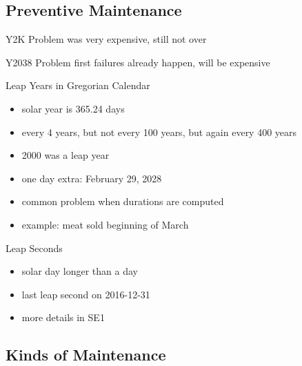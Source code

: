 \subsection{Preventive Maintenance}
\begin{frame}{\insertsubsection}
	\begin{fancycolumns}
		\begin{definition}{\insertsubsection\mysource{\lientzswanson}}
			 \hfill {}
		\end{definition}
		\begin{example}{Y2K Problem}
			was very expensive, still not over
		\end{example}
		\begin{example}{Y2038 Problem}
			first failures already happen, will be expensive
		\end{example}
	\nextcolumn
		\begin{example}{Leap Years in Gregorian Calendar}
			\begin{itemize}
				\item solar year is 365.24 days
				\item every 4 years, but not every 100 years, but again every 400 years
				\item 2000 was a leap year
				\item one day extra: February 29, 2028
				\item common problem when durations are computed
				\item example: meat sold beginning of March
			\end{itemize}
		\end{example}
		\begin{example}{Leap Seconds}
			\begin{itemize}
				\item solar day longer than a day
				\item last leap second on 2016-12-31
				\item more details in SE1
			\end{itemize}
			\centering{}
		\end{example}
	\end{fancycolumns}
\end{frame}

\subsection{Kinds of Maintenance}
\begin{frame}{\insertsubsection\ \mytitlesource{\ludewiglichter}}
	\begin{fancycolumns}
		\nextcolumn
	\end{fancycolumns}
\end{frame}

